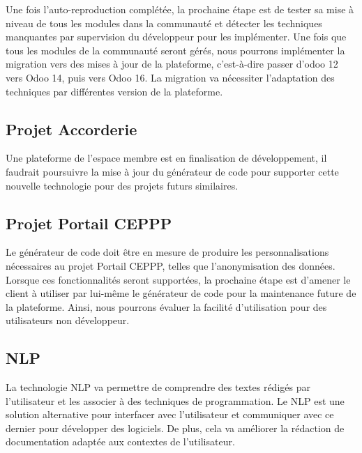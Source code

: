 
Une fois l'auto-reproduction complétée, la prochaine étape est de tester sa mise à niveau de tous les modules dans la communauté et détecter les techniques manquantes par supervision du développeur pour les implémenter. Une fois que tous les modules de la communauté seront gérés, nous pourrons implémenter la migration vers des mises à jour de la plateforme, c’est-à-dire passer d'odoo 12 vers Odoo 14, puis vers Odoo 16. La migration va nécessiter l'adaptation des techniques par différentes version de la plateforme.


\subsection{Projet Accorderie}

Une plateforme de l'espace membre est en finalisation de développement, il faudrait poursuivre la mise à jour du générateur de code pour supporter cette nouvelle technologie pour des projets futurs similaires.


\subsection{Projet Portail CEPPP}

Le générateur de code doit être en mesure de produire les personnalisations nécessaires au projet Portail CEPPP, telles que l'anonymisation des données. Lorsque ces fonctionnalités seront supportées, la prochaine étape est d'amener le client à utiliser par lui-même le générateur de code pour la maintenance future de la plateforme. Ainsi, nous pourrons évaluer la facilité d'utilisation pour des utilisateurs non développeur.

\subsection{NLP}
La technologie NLP va permettre de comprendre des textes rédigés par l’utilisateur et les associer à des techniques de programmation. Le NLP est une solution alternative pour interfacer avec l’utilisateur et communiquer avec ce dernier pour développer des logiciels. De plus, cela va améliorer la rédaction de documentation adaptée aux contextes de l'utilisateur. 

